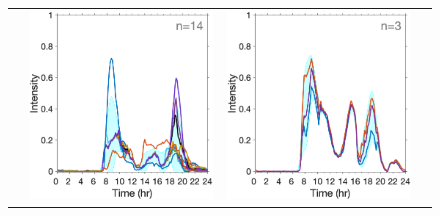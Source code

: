 \documentclass{article}
\begin{document}
\begin{figure}[h!]
\begin{center}
\begin{tabular}{cccc}
			&\hspace*{-0.6cm}
			\includegraphics[scale=0.1]{../2Fittedy/plot/weekday_7/fitted_y_cluster7_3.eps} 
			&\hspace*{-0.6cm}
			\includegraphics[scale=0.1]{../2Fittedy/plot/weekday_7/fitted_y_cluster7_4.eps} \\
			

\end{tabular}
\end{center}
\end{figure}
\end{document}
